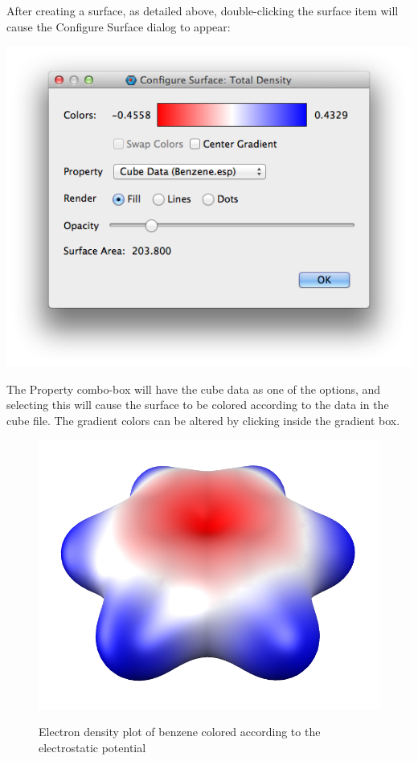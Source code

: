 \documentclass[a4paper,12pt]{article}
\begin{document}
After creating a surface, as detailed above, double-clicking the surface item will
cause the Configure Surface dialog to appear:
\begin{center}
\includegraphics[scale=0.5]{figures/SurfaceConfigurator.png} \\
\end{center}
The Property combo-box will have the cube data as one of the options, and selecting
this will cause the surface to be colored according to the data in the cube file.
The gradient colors can be altered by clicking inside the gradient box.
\begin{figure}[hb]
\begin{center}
\includegraphics[scale=0.3]{figures/Benzene.png} \\
\end{center}
\caption{Electron density plot of benzene colored according to the electrostatic potential}
\end{figure}
\end{document}
